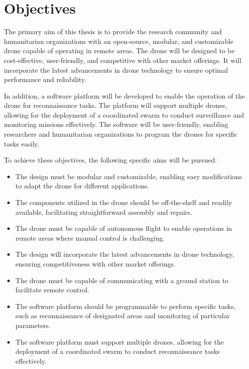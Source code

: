 \chapter{Objectives}
\label{ch:objectives}

The primary aim of this thesis is to provide the research community and humanitarian organizations with an open-source, modular, and customizable drone capable of operating in remote areas. The drone will be designed to be cost-effective, user-friendly, and competitive with other market offerings. It will incorporate the latest advancements in drone technology to ensure optimal performance and reliability.

In addition, a software platform will be developed to enable the operation of the drone for reconnaissance tasks. The platform will support multiple drones, allowing for the deployment of a coordinated swarm to conduct surveillance and monitoring missions effectively. The software will be user-friendly, enabling researchers and humanitarian organizations to program the drones for specific tasks easily.

To achieve these objectives, the following specific aims will be pursued:

\begin{itemize}
  \item The design must be modular and customizable, enabling easy modifications to adapt the drone for different applications.

  \item The components utilized in the drone should be off-the-shelf and readily available, facilitating straightforward assembly and repairs.

  \item The drone must be capable of autonomous flight to enable operations in remote areas where manual control is challenging.

  \item The design will incorporate the latest advancements in drone technology, ensuring competitiveness with other market offerings.

  \item The drone must be capable of communicating with a ground station to facilitate remote control.

  \item The software platform should be programmable to perform specific tasks, such as reconnaissance of designated areas and monitoring of particular parameters.

  \item The software platform must support multiple drones, allowing for the deployment of a coordinated swarm to conduct reconnaissance tasks effectively.
\end{itemize}
